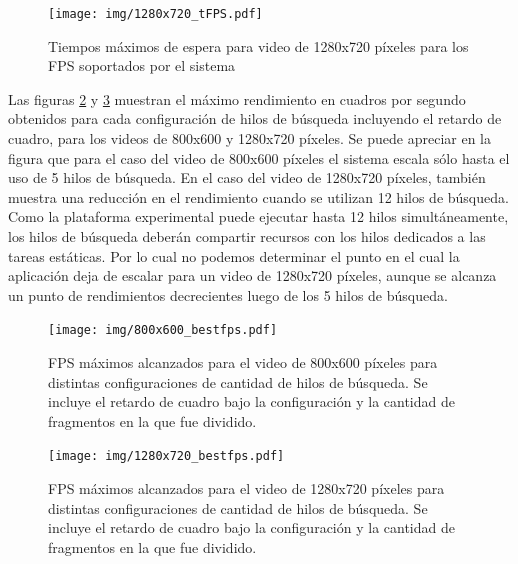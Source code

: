 \begin{figure}[h]

	\texttt{[image: img/1280x720\_tFPS.pdf]}
	\caption{Tiempos máximos de espera para video de 1280x720 píxeles para
	los FPS soportados por el sistema}
	\label{1280tFPS}

\end{figure}

Las figuras \ref{bestFPS800} y \ref{bestFPS1280} muestran el máximo rendimiento
en cuadros por segundo obtenidos para cada configuración de hilos de búsqueda
incluyendo el retardo de cuadro, para los videos de 800x600 y 1280x720 píxeles.
Se puede apreciar en la figura que para el caso del video de 800x600 píxeles el
sistema escala sólo hasta el uso de 5 hilos de búsqueda. En el caso del video de
1280x720 píxeles, también muestra una reducción en el rendimiento cuando se
utilizan 12 hilos de búsqueda. Como la plataforma experimental puede ejecutar
hasta 12 hilos simultáneamente, los hilos de búsqueda deberán compartir recursos
con los hilos dedicados a las tareas estáticas. Por lo cual no podemos
determinar el punto en el cual la aplicación deja de escalar para un video de
1280x720 píxeles, aunque se alcanza un punto de rendimientos decrecientes luego
de los 5 hilos de búsqueda.

\begin{figure}[h]

	\texttt{[image: img/800x600\_bestfps.pdf]}
	\caption{FPS máximos alcanzados para el video de 800x600 píxeles para
	distintas configuraciones de cantidad de hilos de búsqueda. Se incluye
	el retardo de cuadro bajo la configuración y la cantidad de fragmentos
	en la que fue dividido.} \label{bestFPS800}

\end{figure}

\begin{figure}[h]

	\texttt{[image: img/1280x720\_bestfps.pdf]}
	\caption{FPS máximos alcanzados para el video de 1280x720 píxeles para
	distintas configuraciones de cantidad de hilos de búsqueda. Se incluye
	el retardo de cuadro bajo la configuración y la cantidad de fragmentos
	en la que fue dividido.}
	\label{bestFPS1280}

\end{figure}

